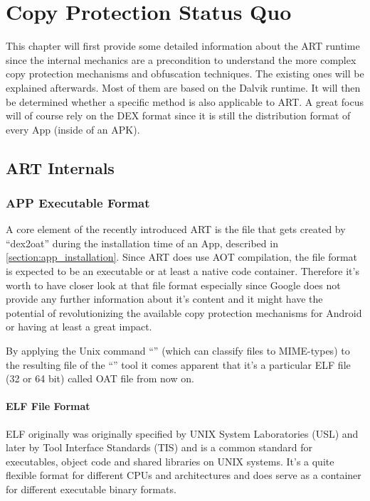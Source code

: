 \chapter{Copy Protection Status Quo}
\label{chapter:copy_protection_status_quo}

This chapter will first provide some detailed information about the ART runtime since the internal mechanics are a precondition to understand the more complex copy protection mechanisms and obfuscation techniques. The existing ones will be explained afterwards. Most of them are based on the Dalvik runtime. It will then be determined whether a specific method is also
applicable to ART. A great focus will of course rely on the DEX format since
it is still the distribution format of every App (inside of an APK).

\section{ART Internals}
\label{section:art_internals}

\subsection{APP Executable Format}\label{section:app_executable_format}

A core element of the recently introduced ART is the file that
gets created by ``dex2oat'' during the installation time of an App,
described in \autoref{section:app_installation}.
Since ART does use AOT compilation, the file format is expected
to be an executable or at least a native code container.
Therefore it's worth to have closer look at that file format
especially since Google does not provide any further information
about it's content and it might have the potential of
revolutionizing the available copy protection mechanisms for
Android or having at least a great impact.

By applying the Unix command ``'' (which can classify
files to MIME-types) to the resulting file of the ``''
tool it comes apparent that it's a particular ELF file (32 or 64 bit)
called OAT file from now on.

\subsubsection{ELF File Format}\label{section:elf_file_format}
ELF originally was originally specified by UNIX System Laboratories
(USL) and later by Tool Interface Standards (TIS) and is a common
standard for executables, object code and shared libraries on UNIX
systems. It's a quite flexible format for different CPUs and
architectures and does serve as a container for different
executable binary formats.

